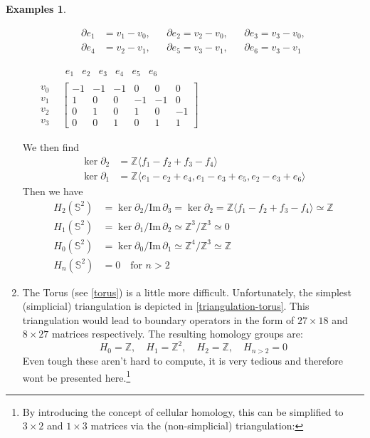 \documentclass[draft,toc=bib]{scrartcl}
\theoremstyle{plain}
\theoremstyle{definition}
\newtheorem{examples}[theorem]{Examples}
\theoremstyle{remark}
\newcommand{\Z}{\mathbb{Z}}
\newcommand{\Sp}{\mathbb{S}}
\newcommand{\im}{\mathrm{Im}\,}
\begin{document}
\begin{examples}
\begin{enumerate}
\parbox[c]{.5\linewidth}{
\begin{align*}
	\partial e_1&=v_1-v_0,&&\partial e_2=v_2-v_0,&&\partial e_3=v_3-v_0,\\
	\partial e_4&=v_2-v_1,&&\partial e_5=v_3-v_1,&&\partial e_6=v_3-v_1
\end{align*}}%
\parbox[c]{.5\linewidth}{$
\quad\begin{matrix}
	&\begin{matrix}e_1&e_2&e_3&e_4&e_5&e_6	\end{matrix}\\
	\begin{matrix}v_0\\v_1\\v_2\\v_3\end{matrix}&
	\begin{bmatrix}
	-1	&-1	&-1	&0	&0	&0\\
	1	&0	&0	&-1	&-1	&0\\
	0	&1	&0	&1	&0	&-1\\
	0	&0	&1	&0	&1	&1
	\end{bmatrix}
\end{matrix}$
}
We then find
\begin{align*}
\ker \partial_2&=\Z\langle f_1-f_2+f_3-f_4\rangle\\
\ker \partial_1&=\Z\langle e_1-e_2+e_4,e_1-e_3+e_5, e_2-e_3+e_6 \rangle
\end{align*}
Then we have
\begin{align*}
	H_2(\Sp^2)&=\ker \partial_2/\im \partial_3=\ker \partial_2=\Z\langle f_1-f_2+f_3-f_4\rangle\simeq\Z\\
	H_1(\Sp^2)&=\ker \partial_1/\im \partial_2\simeq\Z^3/\Z^3\simeq 0\\
	H_0(\Sp^2)&=\ker\partial_0/\im \partial_1\simeq \Z^4/\Z^3\simeq \Z\\
	H_n(\Sp^2)&=0\quad \text{for $n>2$}
\end{align*}


\item The Torus (see \autoref{torus}) is a little more difficult. Unfortunately, the simplest (simplicial) triangulation is depicted in \autoref{triangulation-torus}. This triangulation would lead to boundary operators in the form of  $27\times 18$  and  $8\times 27$ matrices respectively.  The resulting homology groups are:
\[
H_0=\Z,\quad H_1=\Z^2,\quad H_2=\Z,\quad H_{n>2}=0
\]
Even tough these aren't hard to compute, it is very tedious and therefore wont be presented here.\footnote{By introducing the concept of cellular homology, this can be simplified to $3\times 2$ and $1\times 3$ matrices via the \glqq(non-simplicial)  triangulation\grqq:	
	
}
\end{enumerate}
\end{examples}
\end{document}
